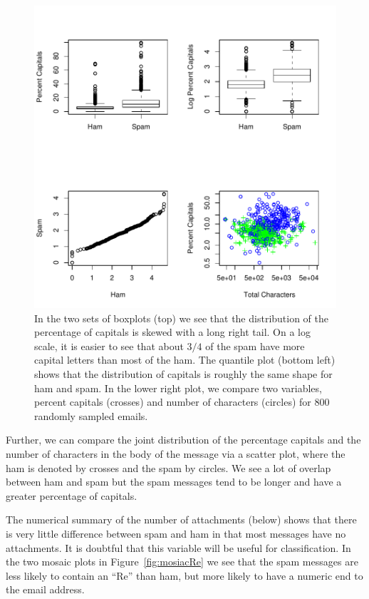 \begin{figure}
\includegraphics{Spam/EDApercentCapitals.pdf}
\caption{In the two sets of boxplots (top) we see that the 
distribution of the percentage of capitals is skewed with a 
long right tail. 
On a log scale, it is easier to see that about $3/4$ of the spam 
have more capital letters than most of the ham. 
The quantile plot (bottom left) shows that the distribution of capitals
is roughly the same shape for ham and spam.
In the lower right plot, we compare two variables,
percent capitals (crosses) and number of characters (circles)
for 800 randomly sampled emails.}
\label{fig:boxplotSpam}
\end{figure}

Further, we can compare the joint distribution of 
the percentage capitals and the number of characters 
in the body of the message via a scatter plot, 
where the ham is denoted by crosses and the spam by circles.
We see a lot of overlap between ham and spam but the spam
messages tend to be longer and have a greater percentage of capitals.

The numerical summary of the number of attachments (below)
shows that there is very little difference between
spam and ham in that most messages have no attachments.
It is doubtful that this variable will be useful
for classification.
In the two mosaic plots in Figure~\ref{fig:mosiacRe} 
we see that the spam messages are less likely to contain 
an ``Re'' than ham, but more likely to have a numeric end 
to the email address.

